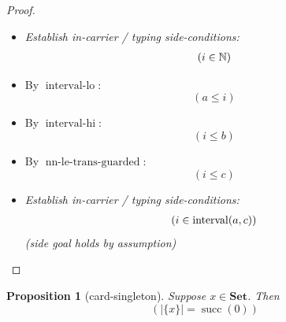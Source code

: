 \documentclass[11pt]{article}
\theoremstyle{plain}
\newtheorem{proposition}{Proposition}
\begin{document}
\begin{proof}
\begin{itemize}[leftmargin=2.8em, itemsep=4pt, parsep=1pt]
  \item[\textbf{3}] \emph{Establish in-carrier / typing side-conditions:}
\begin{equation*}
\begin{array}{@{}l@{}}
(i \in \mathbb{N})
\end{array}
\end{equation*}

  \item[\textbf{4}] By $\operatorname{interval\text{-}lo}$:
\begin{equation*}
(a \leq i)
\end{equation*}

  \item[\textbf{5}] By $\operatorname{interval\text{-}hi}$:
\begin{equation*}
(i \leq b)
\end{equation*}

  \item[\textbf{6}] By $\operatorname{nn\text{-}le\text{-}trans\text{-}guarded}$:
\begin{equation*}
(i \leq c)
\end{equation*}

  \item[\textbf{7--8}] \emph{Establish in-carrier / typing side-conditions:}
\begin{equation*}
\begin{array}{@{}l@{}}
(i \in \operatorname{interval}(a, c))
\end{array}
\end{equation*}
  \emph{(side goal holds by assumption)}
\end{itemize}
\end{proof}

\bigskip

\begin{proposition}[card-singleton]
Suppose $x \in \mathbf{Set}$. Then
\begin{equation*}
(|\{x\}| = \operatorname{succ}(0))
\end{equation*}

\end{proposition}
\end{document}
